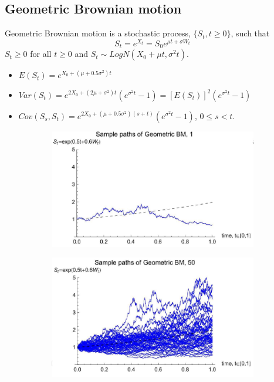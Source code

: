 \documentclass[11pt,a4paper]{book}
\theoremstyle{definition}\newtheorem{definition}{Definition}
\theoremstyle{definition}\newtheorem{fact}{Fact}
\theoremstyle{definition}\newtheorem{remark}{Remark}
\theoremstyle{definition}\newtheorem{ex}{Ex.}
\theoremstyle{definition}\newtheorem{project}{Project}
\theoremstyle{definition}\newtheorem{problem}{Problem}
\theoremstyle{definition}\newtheorem{example}{Example}
\numberwithin{theorem}{section}
\numberwithin{corollary}{chapter}
\numberwithin{assumption}{chapter}
\numberwithin{definition}{chapter}
\numberwithin{prop}{chapter}
\numberwithin{notation}{chapter}
\numberwithin{problem}{chapter}
\numberwithin{example}{chapter}
\numberwithin{fact}{chapter}
\numberwithin{ex}{chapter}
\begin{document}
\subsection{Geometric Brownian motion}
Geometric Brownian motion is a stochastic process, $\{S_t, t \geq 0\}$, such that
$$ S_t = e^{X_t} = S_0 e^{\mu t + \sigma W_t} $$
$ S_t \geq 0 $ for all $t \geq 0$ and $S_t \sim LogN(X_0+\mu t, \sigma^2 t)$.
\begin{itemize}
\item $E(S_t) = e^{X_0+(\mu+0.5\sigma^2)t}$
\item $Var(S_t) = e^{2X_0 + (2\mu + \sigma^2)t} (e^{\sigma^2 t} -1) = [E(S_t)]^2 (e^{\sigma^2 t}-1)$
\item $Cov(S_s,S_t) = e^{2X_0 + (\mu + 0.5\sigma^2)(s+t)}(e^{\sigma^2 t} -1)$, $0\leq s < t$.
\end{itemize}

\begin{figure}[H]
	\begin{subfigure}{0.5\textwidth}
		\centering
		\includegraphics[scale=0.5]{Chapter01/Chapter1_6.png}
	\end{subfigure}
	\begin{subfigure}{0.5\textwidth}
		\centering
		\includegraphics[scale=0.5]{Chapter01/Chapter1_7.png}
	\end{subfigure}
\end{figure}
\end{document}
